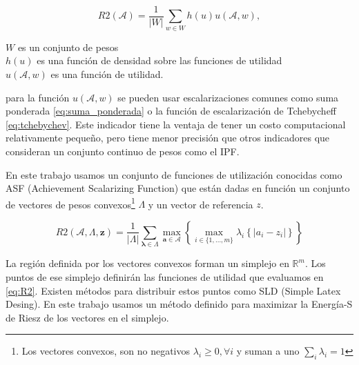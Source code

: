 \begin{equation} 
    R2(\mathcal{A})=\frac{1}{|W|}\sum_{w\in W} h(u)u(\mathcal{A},w), \nonumber
\end{equation}

$W$ es un conjunto de pesos\\
$h(u)$ es una función de densidad sobre las funciones de utilidad\\
$u(\mathcal{A},w)$ es una función de utilidad.

para la función $u(\mathcal{A},w)$ se pueden usar escalarizaciones comunes como suma ponderada \eqref{eq:suma_ponderada} o la función de escalarización de Tchebycheff \eqref{eq:tchebychev}. Este indicador tiene la ventaja de tener un costo computacional relativamente pequeño, pero tiene menor precisión que otros indicadores que consideran un conjunto continuo de pesos como el IPF. 



En este trabajo usamos un conjunto de funciones de utilización conocidas como ASF (Achievement Scalarizing Function) que están dadas en función un conjunto de vectores de pesos convexos\footnote{Los vectores convexos, son no negativos $\lambda_i\geq 0, \forall i$ y suman a uno $\sum_i \lambda_i =1$} $\Lambda$ y un vector de referencia $z$. 

\begin{equation}\label{eq:R2}
    R2(\mathcal{A}, \Lambda, \mathbf{z}) = \frac{1}{|\Lambda|} \sum_{\mathbf{\lambda} \in \Lambda} \max_{\mathbf{a} \in \mathcal{A}} \left\{ \max_{i \in \{1, \ldots, m\}} \lambda_i \left\{ |a_i - z_i|\right\} \right\}
\end{equation}

La región definida por los vectores convexos forman un simplejo en $\mathbb{R}^m$. Los puntos de ese simplejo definirán las funciones de utilidad que evaluamos en \ref{eq:R2}. Existen métodos para distribuir estos puntos como SLD (Simple Latex Desing). En este trabajo usamos un método definido para maximizar la Energía-S de Riesz de los vectores en el simplejo. 

